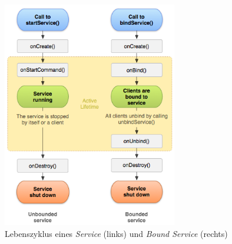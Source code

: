 \documentclass[]{report}
\begin{document}
\begin{figure}
    \centering 
    \includegraphics[width=3.0in]{bilder/boundservice.png}
    \caption{Lebenszyklus eines \textit{Service} (links) und \textit{Bound Service} (rechts) \cite{android}}
    \label{fig:lifetime}
\end{figure}
\end{document}
